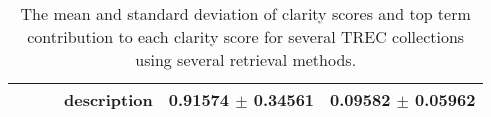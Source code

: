\begin{table*}
\begin{tabular}{| c || c | c | c || c | c |}
    &   &   &   description %
                &   0.91574 $\pm$ 0.34561 & 0.09582 $\pm$ 0.05962\\
    \hline
  \end{tabular}
  \caption{The mean and standard deviation of clarity scores and top term contribution to each clarity score for several TREC collections using several retrieval methods.}
  \label{table:clarity-scores}
\end{table*}

